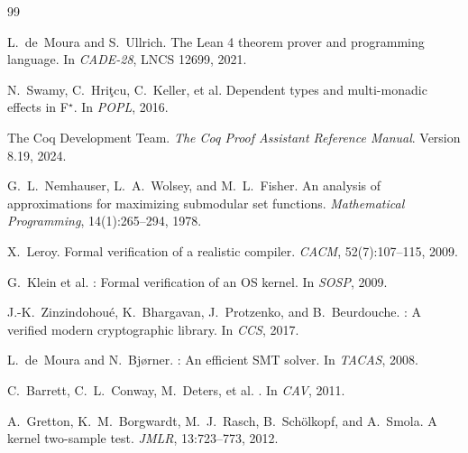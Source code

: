 \documentclass[11pt]{article}
\begin{document}
\begin{thebibliography}{99}

L.\ de~Moura and S.\ Ullrich.
\newblock The {Lean 4} theorem prover and programming language.
\newblock In \emph{CADE-28}, LNCS 12699, 2021.

N.\ Swamy, C.\ Hri\c{t}cu, C.\ Keller, et al.
\newblock Dependent types and multi-monadic effects in {F$^\star$}.
\newblock In \emph{POPL}, 2016.

The {Coq} Development Team.
\newblock \emph{The {Coq} Proof Assistant Reference Manual}.
\newblock Version 8.19, 2024.

G.\ L.\ Nemhauser, L.\ A.\ Wolsey, and M.\ L.\ Fisher.
\newblock An analysis of approximations for maximizing submodular set
  functions.
\newblock \emph{Mathematical Programming}, 14(1):265--294, 1978.

X.\ Leroy.
\newblock Formal verification of a realistic compiler.
\newblock \emph{CACM}, 52(7):107--115, 2009.

G.\ Klein et al.
: Formal verification of an {OS} kernel.
\newblock In \emph{SOSP}, 2009.

J.-K.\ Zinzindohou{\'e}, K.\ Bhargavan, J.\ Protzenko, and B.\ Beurdouche.
: A verified modern cryptographic library.
\newblock In \emph{CCS}, 2017.

L.\ de~Moura and N.\ Bj{\o}rner.
: An efficient {SMT} solver.
\newblock In \emph{TACAS}, 2008.

C.\ Barrett, C.\ L.\ Conway, M.\ Deters, et al.
.
\newblock In \emph{CAV}, 2011.

A.\ Gretton, K.\ M.\ Borgwardt, M.\ J.\ Rasch, B.\ Sch\"{o}lkopf, and
  A.\ Smola.
\newblock A kernel two-sample test.
\newblock \emph{JMLR}, 13:723--773, 2012.

\end{thebibliography}
\end{document}
